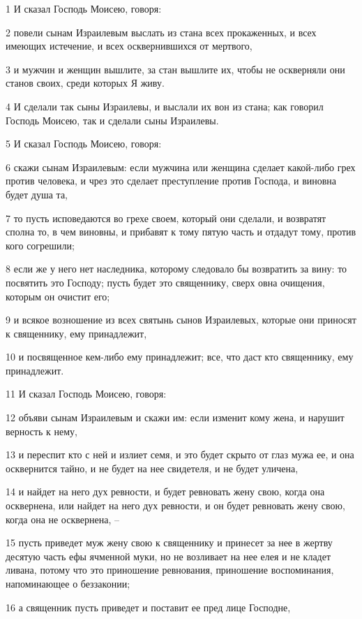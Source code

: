 \par 1 И сказал Господь Моисею, говоря:
\par 2 повели сынам Израилевым выслать из стана всех прокаженных, и всех имеющих истечение, и всех осквернившихся от мертвого,
\par 3 и мужчин и женщин вышлите, за стан вышлите их, чтобы не оскверняли они станов своих, среди которых Я живу.
\par 4 И сделали так сыны Израилевы, и выслали их вон из стана; как говорил Господь Моисею, так и сделали сыны Израилевы.
\par 5 И сказал Господь Моисею, говоря:
\par 6 скажи сынам Израилевым: если мужчина или женщина сделает какой-либо грех против человека, и чрез это сделает преступление против Господа, и виновна будет душа та,
\par 7 то пусть исповедаются во грехе своем, который они сделали, и возвратят сполна то, в чем виновны, и прибавят к тому пятую часть и отдадут тому, против кого согрешили;
\par 8 если же у него нет наследника, которому следовало бы возвратить за вину: то посвятить это Господу; пусть будет это священнику, сверх овна очищения, которым он очистит его;
\par 9 и всякое возношение из всех святынь сынов Израилевых, которые они приносят к священнику, ему принадлежит,
\par 10 и посвященное кем-либо ему принадлежит; все, что даст кто священнику, ему принадлежит.
\par 11 И сказал Господь Моисею, говоря:
\par 12 объяви сынам Израилевым и скажи им: если изменит кому жена, и нарушит верность к нему,
\par 13 и переспит кто с ней и излиет семя, и это будет скрыто от глаз мужа ее, и она осквернится тайно, и не будет на нее свидетеля, и не будет уличена,
\par 14 и найдет на него дух ревности, и будет ревновать жену свою, когда она осквернена, или найдет на него дух ревности, и он будет ревновать жену свою, когда она не осквернена, --
\par 15 пусть приведет муж жену свою к священнику и принесет за нее в жертву десятую часть ефы ячменной муки, но не возливает на нее елея и не кладет ливана, потому что это приношение ревнования, приношение воспоминания, напоминающее о беззаконии;
\par 16 а священник пусть приведет и поставит ее пред лице Господне,
